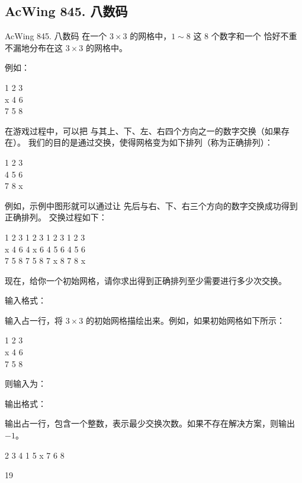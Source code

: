 \subsection{AcWing 845. 八数码}
\begin{titledbox}{AcWing 845. 八数码}
    在一个 $3 \times 3$ 的网格中，$1 \sim 8$ 这 $8$ 个数字和一个  恰好不重不漏地分布在这 $3 \times 3$ 的网格中。

    例如：

    1 2 3 \\
    x 4 6 \\
    7 5 8

    在游戏过程中，可以把  与其上、下、左、右四个方向之一的数字交换（如果存在）。
    我们的目的是通过交换，使得网格变为如下排列（称为正确排列）：

    1 2 3 \\
    4 5 6 \\
    7 8 x

    例如，示例中图形就可以通过让  先后与右、下、右三个方向的数字交换成功得到正确排列。
    交换过程如下：

    1 2 3 \hspace{1em} 1 2 3 \hspace{1em} 1 2 3 \hspace{1em} 1 2 3 \\
    x 4 6 \hspace{1em} 4 x 6 \hspace{1em} 4 5 6 \hspace{1em} 4 5 6 \\
    7 5 8 \hspace{1em} 7 5 8 \hspace{1em} 7 x 8 \hspace{1em} 7 8 x

    现在，给你一个初始网格，请你求出得到正确排列至少需要进行多少次交换。

    输入格式：

    输入占一行，将 $3 \times 3$ 的初始网格描绘出来。例如，如果初始网格如下所示：

    1 2 3 \\
    x 4 6 \\
    7 5 8

    则输入为：

    输出格式：

    输出占一行，包含一个整数，表示最少交换次数。如果不存在解决方案，则输出 $-1$。

    \begin{inputblock}
        2 3 4 1 5 x 7 6 8
    \end{inputblock}
    \begin{outputblock}
        19
    \end{outputblock}
\end{titledbox}


